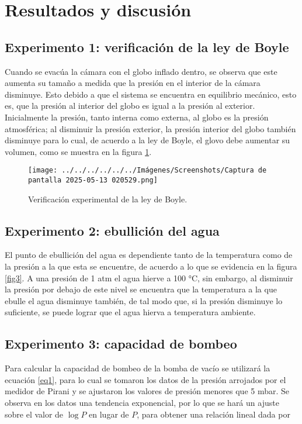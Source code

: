 \documentclass[final,5p,times,twocolumn, nopreprintline]{elsarticle}
\numberwithin{equation}{section}
\begin{document}
\section{Resultados y discusión}

\subsection{Experimento 1: verificación de la ley de Boyle}

Cuando se evacúa la cámara con el globo inflado dentro, se observa que este aumenta su tamaño a medida que la presión en el interior de la cámara disminuye. Esto debido a que el sistema se encuentra en equilibrio mecánico, esto es, que la presión al interior del globo es igual a la presión al exterior. Inicialmente la presión, tanto interna como externa, al globo es la presión atmosférica; al disminuir la presión exterior, la presión interior del globo también disminuye para lo cual, de acuerdo a la ley de Boyle, el glovo debe aumentar su volumen, como se muestra en la figura \ref{fig5}.

\begin{figure}[h!]
\begin{center}
\texttt{[image: ../../../../../../Imágenes/Screenshots/Captura de pantalla 2025-05-13 020529.png]} 
\caption{Verificación experimental de la ley de Boyle.} \label{fig5}
\end{center}
\end{figure}

\subsection{Experimento 2: ebullición del agua}

El punto de ebullición del agua es dependiente tanto de la temperatura como de la presión a la que esta se encuentre, de acuerdo a lo que se evidencia en la figura \ref{fig3}. A una presión de 1 atm el agua hierve a 100 °C, sin embargo, al disminuir la presión por debajo de este nivel se encuentra que la temperatura a la que ebulle el agua disminuye también, de tal modo que, si la presión disminuye lo suficiente, se puede lograr que el agua hierva a temperatura ambiente.

\subsection{Experimento 3: capacidad de bombeo}

Para calcular la capacidad de bombeo de la bomba de vacío se utilizará la ecuación \ref{eq1}, para lo cual se tomaron los datos de la presión arrojados por el medidor de Pirani y se ajustaron los valores de presión menores que 5 mbar. Se observa en los datos una tendencia exponencial, por lo que se hará un ajuste sobre el valor de $\log P$ en lugar de $P$, para obtener una relación lineal dada por
\end{document}
